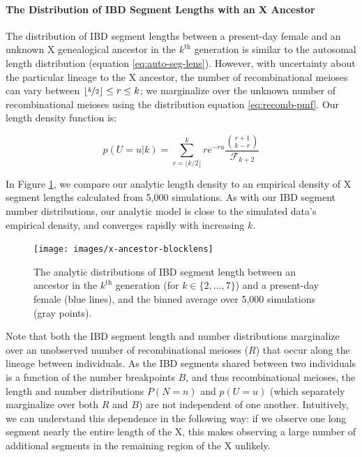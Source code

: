 \documentclass[11pt]{article}
\begin{document}
\paragraph{The Distribution of IBD Segment Lengths with an X Ancestor}

The distribution of IBD segment lengths between a present-day female and an
unknown X genealogical ancestor in the $k^\text{th}$ generation is similar to
the autosomal length distribution (equation \ref{eq:auto-seg-lens}). However,
with uncertainty about the particular lineage to the X ancestor, the number of
recombinational meioses can vary between $\lfloor \nicefrac{k}{2} \rfloor \le r
\le k$; we marginalize over the unknown number of recombinational meioses using
the distribution equation \eqref{eq:recomb-pmf}. Our length density function
is:

\begin{equation}
  \label{eq:x-anc-length}
  p(U = u | k) = \sum_{r=\lfloor k/2 \rfloor}^k  r e^{-ru} \frac{{r+1 \choose k-r}}{\mathcal{F}_{k+2}} 
\end{equation}

In Figure \ref{fig:x-len-dist}, we compare our analytic length density to an
empirical density of X segment lengths calculated from 5,000 simulations. As
with our IBD segment number distributions, our analytic model is close to the
simulated data's empirical density, and converges rapidly with increasing $k$.

\begin{figure}[!ht]
  \centering
  \texttt{[image: images/x-ancestor-blocklens]}

  \caption{The analytic distributions of IBD segment length between an ancestor
  in the $k^\text{th}$ generation (for $k \in \{2, \ldots, 7\}$) and a
  present-day female (blue lines), and the binned average over 5,000
  simulations (gray points).}

  \label{fig:x-len-dist}
\end{figure}

Note that both the IBD segment length and number distributions marginalize over
an unobserved number of recombinational meioses ($R$) that occur along the
lineage between individuals. As the IBD segments shared between two individuals
is a function of the number breakpoints $B$, and thus recombinational meioses,
the length and number distributions $P(N = n)$ and $p(U = u)$ (which separately
marginalize over both $R$ and $B$) are not independent of one another.
Intuitively, we can understand this dependence in the following way: if we
observe one long segment nearly the entire length of the X, this makes
observing a large number of additional segments in the remaining region of the
X unlikely.
\end{document}
